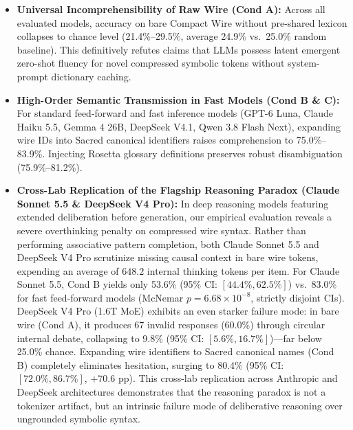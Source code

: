 \documentclass[9pt,a4paper]{extarticle}
\begin{document}
\begin{itemize}
  \item \textbf{Universal Incomprehensibility of Raw Wire (Cond A):} Across all evaluated models, accuracy on bare Compact Wire without pre-shared lexicon collapses to chance level (21.4\%--29.5\%, average 24.9\% vs.\ 25.0\% random baseline). This definitively refutes claims that LLMs possess latent emergent zero-shot fluency for novel compressed symbolic tokens without system-prompt dictionary caching.
  \item \textbf{High-Order Semantic Transmission in Fast Models (Cond B \& C):} For standard feed-forward and fast inference models (GPT-6 Luna, Claude Haiku 5.5, Gemma 4 26B, DeepSeek V4.1, Qwen 3.8 Flash Next), expanding wire IDs into Sacred canonical identifiers raises comprehension to 75.0\%--83.9\%. Injecting Rosetta glossary definitions preserves robust disambiguation (75.9\%--81.2\%).
  \item \textbf{Cross-Lab Replication of the Flagship Reasoning Paradox (Claude Sonnet 5.5 \& DeepSeek V4 Pro):} In deep reasoning models featuring extended deliberation before generation, our empirical evaluation reveals a severe overthinking penalty on compressed wire syntax. Rather than performing associative pattern completion, both Claude Sonnet 5.5 and DeepSeek V4 Pro scrutinize missing causal context in bare wire tokens, expending an average of $648.2$ internal thinking tokens per item. For Claude Sonnet 5.5, Cond B yields only 53.6\% (95\% CI: $[44.4\%, 62.5\%]$) vs.\ 83.0\% for fast feed-forward models (McNemar $p = 6.68 \times 10^{-8}$, strictly disjoint CIs). DeepSeek V4 Pro (1.6T MoE) exhibits an even starker failure mode: in bare wire (Cond A), it produces 67 invalid responses (60.0\%) through circular internal debate, collapsing to 9.8\% (95\% CI: $[5.6\%, 16.7\%]$)---far below 25.0\% chance. Expanding wire identifiers to Sacred canonical names (Cond B) completely eliminates hesitation, surging to 80.4\% (95\% CI: $[72.0\%, 86.7\%]$, $+70.6$ pp). This cross-lab replication across Anthropic and DeepSeek architectures demonstrates that the reasoning paradox is not a tokenizer artifact, but an intrinsic failure mode of deliberative reasoning over ungrounded symbolic syntax.
\end{itemize}
\end{document}
